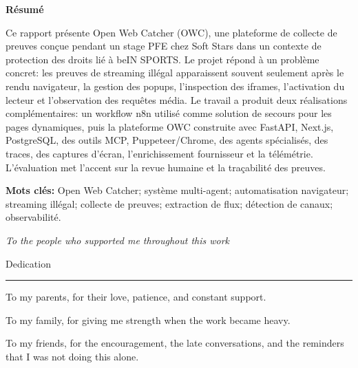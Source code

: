 \documentclass[12pt,a4paper,twoside]{report}
\newcommand{\acktitlefont}{\rmfamily}
\newcommand{\ackbodyfont}{\rmfamily}
\newenvironment{abstractresumeblock}[1]{%
  \par\vspace{0.72em}%
  \begin{center}%
  {\bfseries\fontsize{13.0}{16.0}\selectfont #1\par}%
  \vspace{0.28em}%
  \begin{minipage}{0.80\textwidth}%
  \small\setlength{\parindent}{0pt}\setlength{\parskip}{0.34em}%
  \setstretch{1.08}%
}{%
  \end{minipage}%
  \end{center}\par\vspace{0.28em}%
}
\begin{document}
\vspace{0.28em}
\begin{abstractresumeblock}{R\'esum\'e}
Ce rapport pr\'esente Open Web Catcher (OWC), une plateforme de collecte de preuves con\c{c}ue pendant un stage PFE chez Soft Stars dans un contexte de protection des droits li\'e \`a beIN SPORTS\@. Le projet r\'epond \`a un probl\`eme concret: les preuves de streaming ill\'egal apparaissent souvent seulement apr\`es le rendu navigateur, la gestion des popups, l'inspection des iframes, l'activation du lecteur et l'observation des requ\^etes m\'edia. Le travail a produit deux r\'ealisations compl\'ementaires: un workflow n8n utilis\'e comme solution de secours pour les pages dynamiques, puis la plateforme OWC construite avec FastAPI, Next.js, PostgreSQL, des outils MCP, Puppeteer/Chrome, des agents sp\'ecialis\'es, des traces, des captures d'\'ecran, l'enrichissement fournisseur et la t\'el\'em\'etrie. L'\'evaluation met l'accent sur la revue humaine et la tra\c{c}abilit\'e des preuves.
\par\smallskip
\textbf{Mots cl\'es:} Open Web Catcher; syst\`eme multi-agent; automatisation navigateur; streaming ill\'egal; collecte de preuves; extraction de flux; d\'etection de canaux; observabilit\'e.
\end{abstractresumeblock}

\clearpage

{}
\thispagestyle{plain}
\begingroup
\ackbodyfont
\setlength{\parindent}{0pt}
\setlength{\parskip}{0.45em}

\vspace*{0.35cm}
\begin{center}
  {\ackbodyfont\itshape\fontsize{17}{25}\selectfont To the people who supported me throughout this work\par}
  \vspace{1.25cm}
  {\acktitlefont\fontsize{48}{56}\selectfont Dedication\par}
  \vspace{0.26cm}
  {\color{black!32}\rule{0.22\textwidth}{0.45pt}}\par
\end{center}

\vfill

\begin{flushright}
{\ackbodyfont\fontsize{16.2}{25.5}\selectfont
To my parents, for their love, patience, and constant support.\par
To my family, for giving me strength when the work became heavy.\par
To my friends, for the encouragement, the late conversations, and the reminders
that I was not doing this alone.\par}
\end{flushright}
\end{document}

